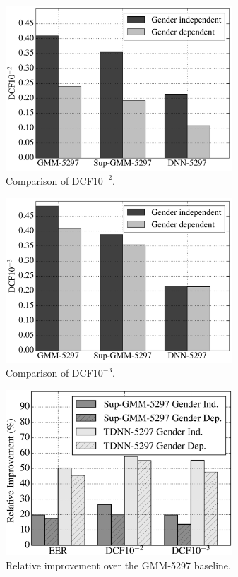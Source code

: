 \documentclass{article}
\begin{document}
\begin{figure}[t]
\centerline{\includegraphics[width=8.5cm]{fig/dcf-2}}
\caption{Comparison of DCF$10^{-2}$.}
\label{fig:dcf_2}
\end{figure}

\begin{figure}[t]
\centerline{\includegraphics[width=8.5cm]{fig/dcf-3}}
\caption{Comparison of DCF$10^{-3}$.}
\label{fig:dcf_3}
\end{figure}

\begin{figure}[th]
\centerline{\includegraphics[width=8.5cm]{fig/rel}}
\caption{Relative improvement over
              the GMM-5297 baseline.}
\label{fig:rel}
\end{figure}
\end{document}
